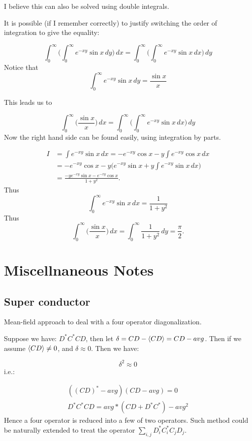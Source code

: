 \documentclass{article}
\numberwithin{equation}{subsection} %
\theoremstyle{definition}
\begin{document}
I believe this can also be solved using double integrals.

It is possible (if I remember correctly) to justify switching the order of integration to give the equality:

$$\int_{0}^{\infty} \Bigg(\int_{0}^{\infty} e^{-xy} \sin x \,dy \Bigg)\, dx = \int_{0}^{\infty} \Bigg(\int_{0}^{\infty} e^{-xy} \sin x \,dx \Bigg)\,dy$$
Notice that
$$\int_{0}^{\infty} e^{-xy} \sin x\,dy = \frac{\sin x}{x}$$

This leads us to

$$\int_{0}^{\infty} \Big(\frac{\sin x}{x} \Big) \,dx = \int_{0}^{\infty} \Bigg(\int_{0}^{\infty} e^{-xy} \sin x \,dx \Bigg)\,dy$$
Now the right hand side can be found easily, using integration by parts.

\begin{align*}
I &= \int e^{-xy} \sin x \,dx = -e^{-xy}{\cos x} - y \int e^{-xy} \cos x \, dx\\
&= -e^{-xy}{\cos x} - y \Big(e^{-xy}\sin x + y \int e^{-xy} \sin x \,dx \Big)\\
&= \frac{-ye^{-xy}\sin x - e^{-xy}\cos x}{1+y^2}.
\end{align*}
Thus $$\int_{0}^{\infty} e^{-xy} \sin x \,dx = \frac{1}{1+y^2}$$
Thus $$\int_{0}^{\infty} \Big(\frac{\sin x}{x} \Big) \,dx = \int_{0}^{\infty}\frac{1}{1+y^2}\,dy = \frac{\pi}{2}.$$


\section{Miscellnaneous Notes}
    \subsection{Super conductor}
    Mean-field approach to deal with a four operator diagonalization.
    
    Suppose we have: $D^*C^* CD$, then let $\delta = CD - \braket{CD} =
    CD - avg$. Then if we assume $\braket{CD}\neq 0$, and $\delta \approx 0$. Then we have:
    
    	$$ \delta^2 \approx 0 $$
    i.e.:
    
    \begin{align}
    	( (CD)^* - avg ) ( CD - avg ) = 0\\
    	D^*C^*CD = avg*(CD+D^*C^*) - avg^2
    \end{align}
    Hence a four operator is reduced into a few of two operators.
    Such method could be naturally extended to treat the operator
    $\sum_{i,j} D^*_i C^*_i C_j D_j$.
    
\end{document}
